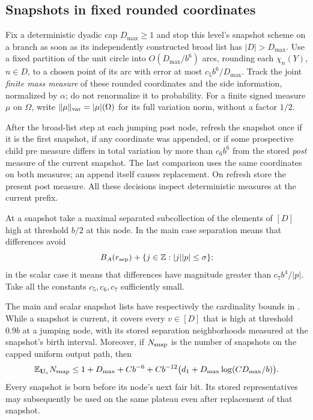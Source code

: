 \subsection{Snapshots in fixed rounded coordinates}

Fix a deterministic dyadic cap $D_{\max}\ge1$ and stop this level's snapshot
scheme on a branch as soon as its independently constructed broad list has
$|D|>D_{\max}$. Use a fixed partition of the unit circle into
$O(D_{\max}/b^6)$ arcs, rounding each $\chi_n(Y)$, $n\in D$, to a chosen
point of its arc with error at most $c_5b^6/D_{\max}$. Track the joint
\emph{finite mass measure} of these rounded coordinates and the side
information, normalized by $\alpha$; do not renormalize it to probability.
For a finite signed measure $\mu$ on $\Omega$, write
$\|\mu\|_{\rm var}=|\mu|(\Omega)$ for its full variation norm,
without a factor $1/2$.

After the broad-list step at each jumping post node, refresh the snapshot
once if it is the first snapshot, if any coordinate was appended, or if
some prospective child pre measure differs in total variation by more than
$c_6b^6$ from the stored \emph{post} measure of the current snapshot. The
last comparison uses the same coordinates on both measures; an append
itself causes replacement. On refresh store the present post measure.
All these decisions inspect deterministic measures at the current prefix.

At a snapshot take a maximal separated subcollection of the elements of
$[D]$ high at threshold $b/2$ at this node. In the main case separation means
that differences avoid
\[
 B_A(r_{\rm sep})+\{j\in\mathbb Z:|j||p|\le\sigma\};
\]
in the scalar case it means that differences have magnitude greater than
$c_7b^4/|p|$. Take all the constants $c_5,c_6,c_7$ sufficiently small.

\begin{lemma}\label{lemma:07-snapshots}
The main and scalar snapshot lists have respectively the cardinality bounds
in . While a snapshot is current, it covers every
$v\in[D]$ that is high at threshold $0.9b$ at a jumping node, with its
stored separation neighborhoods measured at the snapshot's birth interval.
Moreover, if $N_{\rm snap}$ is the number of snapshots on the capped
uniform output path, then
\begin{equation}\label{eq:07-snapshot-count}
 \mathbb E_{\mathbf U_e}N_{\rm snap}
 \le 1+D_{\max}+C b^{-6}
       +C b^{-12}\bigl(d_1+D_{\max}\log(CD_{\max}/b)\bigr).
\end{equation}
Every snapshot is born before its node's next fair bit. Its stored
representatives may subsequently be used on the same plateau even after
replacement of that snapshot.
\end{lemma}


